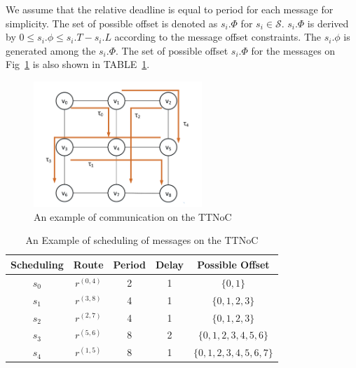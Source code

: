 \documentclass[journal]{IEEEtran}
\newcommand{\calS}{\mathcal{S}}
\theoremstyle{remark}
\begin{document}
We assume that the relative deadline is equal to period for each message for simplicity.
The set of possible offset is denoted as $s_i.\Phi$ for $s_i\in\calS$.
$s_i.\Phi$ is derived by $ 0 \leq s_{i}.\phi \leq s_{i}.T - s_{i}.L $ according to the message offset constraints.
The $s_i.\phi$ is generated among the $s_i.\Phi$.
The set of possible offset $s_i.\Phi$ for the messages on Fig~\ref{f:comm_on_TTNoC} is also shown in TABLE~\ref{t:comm_info}.
\begin{figure}[!t]
	\centering
	\includegraphics[width=2.5in]{picture/scheduling_example.pdf}
	\caption{An example of communication on the TTNoC}
	\label{f:comm_on_TTNoC}
	
\end{figure}
\begin{table}[!t]
	\renewcommand{\arraystretch}{1.3}
		\newcommand{\tabincell}[2]{\begin{tabular}{@{}#1@{}}#2\end{tabular}}
	\caption{An Example of scheduling of messages on the TTNoC}
	\label{t:comm_info}
	\centering
	\begin{tabular}{|c||c||c||c||c|}
		\hline
			\textbf{Scheduling } & 
			\textbf{Route } & 
			\textbf{Period} & 
			\textbf{Delay } & 
			\textbf{Possible Offset}\\
		\hline
		$s_{0}$ & $ r^{(0,4)} $ & 2 & 1 & $\{0,1\}$\\
		\hline
		$s_{1}$ & $ r^{(3,8)} $ & 4 & 1 & $\{0,1,2,3\}$\\
		\hline
		$s_{2}$ & $ r^{(2,7) }$ & 4 & 1 & $\{0,1,2,3\}$\\
		\hline		
		$s_{3}$ & $ r^{(5,6) }$ & 8 & 2 & $\{0,1,2,3,4,5,6\}$\\
		\hline
		$s_{4}$ & $ r^{(1,5) }$ & 8 & 1 & $\{0,1,2,3,4,5,6,7\}$\\
		\hline		
	\end{tabular}
\end{table}
\end{document}
